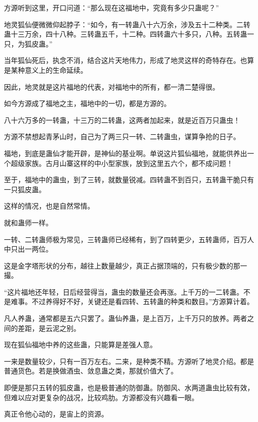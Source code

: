 
\begin{this_body}



方源听到这里，开口问道：“那么现在这福地中，究竟有多少只蛊呢？”

地灵狐仙便微微仰起脖子：“如今，有一转蛊八十六万余，涉及五十二种类。二转蛊十三万余，四十八种。三转蛊五千，十二种。四转蛊六十多只，八种。五转蛊一只，为狐皮蛊。”

当年狐仙死后，执念不消，结合这片天地伟力，形成了地灵这样的奇特存在。也算是某种意义上的生命延续。

因此，地灵就是这片福地的代表，对福地中的所有，都一清二楚得很。

如今方源成了福地之主，福地中的一切，都是方源的。

八十六万多的一转蛊，十三万的二转蛊，这两者加起来，就是近百万只蛊虫！

方源不禁想起青茅山时，自己为了两三只一转、二转蛊虫，谋算争抢的日子。

福地，到底是蛊仙才能开辟，是神仙的基业啊。单说这片狐仙福地，就能供养出一个超级家族。古月山寨这样的中小型家族，放到这里五六个，都不成问题！

至于，福地中的蛊虫，到了三转，就数量锐减。四转蛊不到百只，五转蛊干脆只有一只狐皮蛊。

这样的情况，也是自然常情。

就和蛊师一样。

一转、二转蛊师极为常见，三转蛊师已经稀有，到了四转更少，五转蛊师，百万人中只出一两位。

这是金字塔形状的分布，越往上数量越少，真正占据顶端的，只有极少数的那一撮。

“这片福地还年轻，日后经营得当，蛊虫的数量还会再涨。上千万的一二转蛊。不是难事。不过养得好不好，关键还是看四转、五转蛊的种类和数目。”方源算计着。

凡人养蛊，通常都是五六只罢了。蛊仙养蛊，是上百万，上千万只的放养。两者之间的差距，是云泥之别。

现在狐仙福地中养的这些蛊，只能算是差强人意。

一来是数量较少，只有一百万左右。二来，是种类不精。方源听了地灵介绍。都是普通货色。若是换做酒虫、敛息蛊之类，那就价值大了。

即便是那只五转的狐皮蛊，也是极普通的防御蛊。防御风、水两道蛊虫比较有效，但难以应对更复杂的战况，比较鸡肋。方源都没有兴趣看一眼。

真正令他心动的，是宙上的资源。


\end{this_body}
